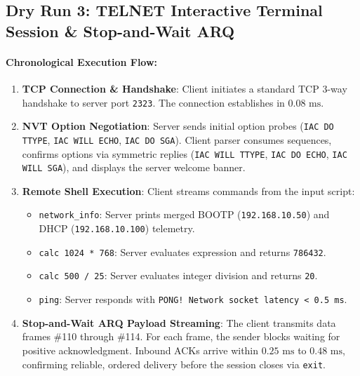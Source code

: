 \documentclass[12pt, a4paper]{article}
\begin{document}
\subsection{Dry Run 3: TELNET Interactive Terminal Session \& Stop-and-Wait ARQ}
\paragraph{Chronological Execution Flow:}
\begin{enumerate}
    \item \textbf{TCP Connection \& Handshake}: Client initiates a standard TCP 3-way handshake to server port \texttt{2323}. The connection establishes in $0.08\text{ ms}$.
    \item \textbf{NVT Option Negotiation}: Server sends initial option probes (\texttt{IAC DO TTYPE}, \texttt{IAC WILL ECHO}, \texttt{IAC DO SGA}). Client parser consumes sequences, confirms options via symmetric replies (\texttt{IAC WILL TTYPE}, \texttt{IAC DO ECHO}, \texttt{IAC WILL SGA}), and displays the server welcome banner.
    \item \textbf{Remote Shell Execution}: Client streams commands from the input script:
    \begin{itemize}
        \item \texttt{network\_info}: Server prints merged BOOTP (\texttt{192.168.10.50}) and DHCP (\texttt{192.168.10.100}) telemetry.
        \item \texttt{calc 1024 * 768}: Server evaluates expression and returns \texttt{786432}.
        \item \texttt{calc 500 / 25}: Server evaluates integer division and returns \texttt{20}.
        \item \texttt{ping}: Server responds with \texttt{PONG! Network socket latency < 0.5 ms}.
    \end{itemize}
    \item \textbf{Stop-and-Wait ARQ Payload Streaming}: The client transmits data frames \#110 through \#114. For each frame, the sender blocks waiting for positive acknowledgment. Inbound ACKs arrive within $0.25\text{ ms}$ to $0.48\text{ ms}$, confirming reliable, ordered delivery before the session closes via \texttt{exit}.
\end{enumerate}
\end{document}
